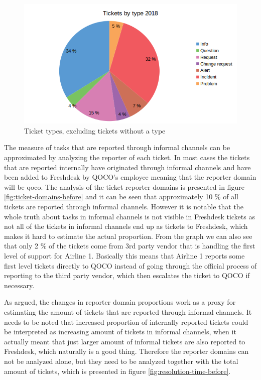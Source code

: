 \begin{figure}[ht]
  \begin{center}
    \includegraphics[width=1.0\textwidth]{images/ticket-types-before-2.png}
    \caption{Ticket types, excluding tickets without a type}
    \label{fig:ticket-types-before}
  \end{center}
\end{figure}

The measure of tasks that are reported through informal channels can be approximated by analyzing the reporter of each ticket. In most cases the tickets that are reported internally have
originated through informal channels and have been added to Freshdesk by QOCO's employee meaning that the reporter domain will be qoco. The analysis of the ticket reporter domains
is presented in figure \ref{fig:ticket-domains-before} and it can be seen that approximately 10 \% of all tickets are reported through informal channels. However it is notable
that the whole truth about tasks in informal channels is not visible in Freshdesk tickets as not all of the tickets in informal channels end up as tickets to Freshdesk, which makes
it hard to estimate the actual proportion. From the graph we can also see that only 2 \% of the tickets come from 3rd party vendor that is handling the first level of support for Airline 1.
Basically this means that Airline 1 reports some first level tickets directly to QOCO instead of going through the official process of reporting to the third party vendor, which then escalates the ticket
to QOCO if necessary.

As argued, the changes in reporter domain proportions work as a proxy for estimating the amount of tickets that are reported through informal channels. It needs to be noted that increased proportion of internally
reported tickets could be interpreted as increasing amount of tickets in informal channels, when it actually meant that just larger amount of informal tickets are also reported to Freshdesk,
which naturally is a good thing. Therefore the reporter domains can not be analyzed alone, but they need to be analyzed together with the total amount of tickets, which is presented in figure
\ref{fig:resolution-time-before}.


